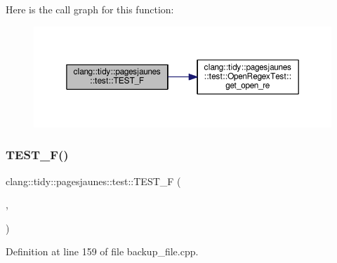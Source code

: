 Here is the call graph for this function\+:
\nopagebreak
\begin{figure}[H]
\begin{center}
\leavevmode
\includegraphics[width=350pt]{namespaceclang_1_1tidy_1_1pagesjaunes_1_1test_a00feadd7e37766026650d2717318278f_cgraph}
\end{center}
\end{figure}
\mbox{\label{namespaceclang_1_1tidy_1_1pagesjaunes_1_1test_a5209433fceb796c949c6b3ce4a1ac56a}} 
\subsubsection{\texorpdfstring{T\+E\+S\+T\+\_\+\+F()}{TEST\_F()}\hspace{0.1cm}{\footnotesize\ttfamily [38/57]}}
{\footnotesize\ttfamily clang\+::tidy\+::pagesjaunes\+::test\+::\+T\+E\+S\+T\+\_\+F (\begin{DoxyParamCaption}\item[{\hyperlink{classclang_1_1tidy_1_1pagesjaunes_1_1test_1_1_backup_file}{Backup\+File}}]{,  }\item[{Simple\+Backup0}]{ }\end{DoxyParamCaption})}



Definition at line 159 of file backup\+\_\+file.\+cpp.

